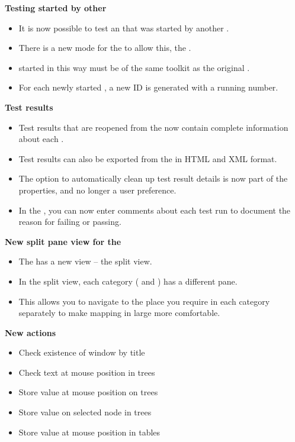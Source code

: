 \documentclass[en,a4paper,twoside,manual,guidancer]{bxreport}
\begin{document}
\textbf{Testing \gdauts{} started by other \gdauts{}}
\begin{itemize}
\item It is now possible to test an \gdaut{} that was started by another \gdaut{}. 
\item There is a new mode for the \gdagent{} to allow this, the .
\item \gdauts{} started in this way must be of the same toolkit as the original \gdaut{}.
\item For each newly started \gdaut{}, a new \gdaut{} ID is generated with a running number. 
\end{itemize}
\textbf{Test results}
\begin{itemize}
\item Test results that are reopened from the \gdtestsummaryview{} now contain complete information about each \gdstep{}.
\item Test results can also be exported from the \gdtestsummaryview{} in HTML and XML format.
\item The option to automatically clean up test result details is now part of the \gdproject{} properties, and no longer a user preference.
\item In the \gdtestsummaryview{}, you can now enter comments about each test run to document the reason for failing or passing. 
\end{itemize}
\textbf{New split pane view for the \gdomeditor{}}
\begin{itemize}
\item The \gdomeditor{} has a new view -- the split view.
\item In the split view, each category ( and ) has a different pane.
\item This allows you to navigate to the place you require in each category separately to make mapping in large \gdprojects{} more comfortable.
\end{itemize}
\textbf{New actions}
\begin{itemize}
\item Check existence of window by title
\item Check text at mouse position in trees
\item Store value at mouse position on trees
\item Store value on selected node in trees
\item Store value at mouse position in tables
\end{itemize}
\end{document}
